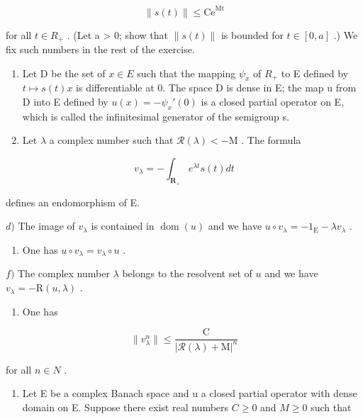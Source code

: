 \[
\| s (t) \| \leqslant \mathrm{Ce} ^ {\mathrm{Mt}}
\]

for all \(t \in R_{+}\) . (Let a \textgreater{} 0; show that \(\|s(t)\|\) is bounded for \(t \in [0, a]\) .) We fix such numbers in the rest of the exercise.

\begin{enumerate}
\def\labelenumi{\alph{enumi})}
\setcounter{enumi}{1}
\item
  Let D be the set of \(x \in E\) such that the mapping \(\psi_{x}\) of \(R_{+}\) to E defined by \(t \mapsto s(t)x\) is differentiable at 0. The space D is dense in E; the map u from D into E defined by \(u(x) = -\psi_{x}'(0)\) is a closed partial operator on E, which is called the infinitesimal generator of the semigroup s.
\item
  Let \(\lambda\) a complex number such that \(\mathcal{R}(\lambda) < -\mathrm{M}\) . The formula
\end{enumerate}

\[
v _ {\lambda} = - \int_ {\mathbf {R} _ {+}} e ^ {\lambda t} s (t) d t
\]

defines an endomorphism of E.

\(d)\) The image of \(v_{\lambda}\) is contained in \(\operatorname{dom}(u)\) and we have \(u \circ v_{\lambda} = -1_{\mathrm{E}} - \lambda v_{\lambda}\) .

\begin{enumerate}
\def\labelenumi{\alph{enumi})}
\setcounter{enumi}{4}
\tightlist
\item
  One has \(u \circ v_{\lambda} = v_{\lambda} \circ u\) .
\end{enumerate}

\(f)\) The complex number \(\lambda\) belongs to the resolvent set of \(u\) and we have \(v_{\lambda} = -\mathrm{R}(u,\lambda)\) .

\begin{enumerate}
\def\labelenumi{\alph{enumi})}
\setcounter{enumi}{6}
\tightlist
\item
  One has
\end{enumerate}

\[
\| v _ {\lambda} ^ {n} \| \leqslant \frac {\mathrm{C}}{| \mathcal {R} (\lambda) + \mathrm{M} | ^ {n}}
\]

for all \(n \in N\) .

\begin{enumerate}
\def\labelenumi{\arabic{enumi})}
\setcounter{enumi}{5}
\tightlist
\item
  Let E be a complex Banach space and u a closed partial operator with dense domain on E. Suppose there exist real numbers \(C \geqslant 0\) and \(M \geqslant 0\) such that
\end{enumerate}

